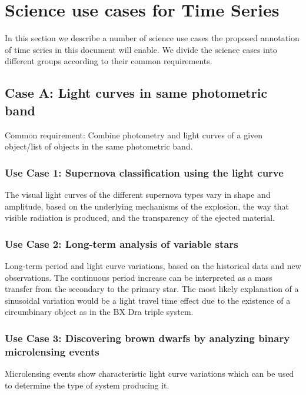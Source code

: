 \documentclass[11pt,a4paper]{ivoa} 
\begin{document}
\section{Science use cases for Time Series}
In this section we describe a number of science use cases the proposed
annotation of time series in this document will enable. We divide the
science cases into different groups according to their common
requirements.
\subsection{Case A: Light curves in same photometric band}
Common requirement: Combine photometry and light curves of a given
object/list of objects in the same photometric band.

\subsubsection{Use Case 1: Supernova classification using the light curve}
The visual light curves of the different supernova types vary in shape
and amplitude, based on the underlying mechanisms of the explosion,
the way that visible radiation is produced, and the transparency of
the ejected material.

\subsubsection{Use Case 2: Long-term analysis of variable stars}
Long-term period and light curve variations, based on the historical
data and new observations. The continuous period increase can be
interpreted as a mass transfer from the secondary to the primary
star. The most likely explanation of a sinusoidal variation would be a
light travel time effect due to the existence of a circumbinary object
as in the BX Dra triple system.

\subsubsection{Use Case 3: Discovering brown dwarfs by analyzing binary microlensing events}
Microlensing events show characteristic light curve variations which
can be used to determine the type of system producing it.

\end{document}
